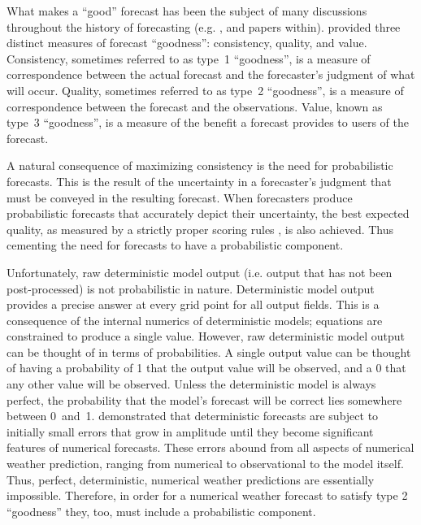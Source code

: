 What makes a ``good'' forecast has been the subject of many discussions throughout the history of forecasting (e.g. \citealp{Mascart1922, Winkler1968, Murphy1993}, \citealp{Murphy1996} and papers within).
\cite{Murphy1993} provided three distinct measures of forecast ``goodness'': consistency, quality, and value.
Consistency, sometimes referred to as \mbox{type 1} ``goodness'', is a measure of correspondence between the actual forecast and the forecaster's judgment of what will occur.
Quality, sometimes referred to as \mbox{type 2} ``goodness'', is a measure of correspondence between the forecast and the observations.
Value, known as \mbox{type 3} ``goodness'', is a measure of the benefit a forecast provides to users of the forecast.


A natural consequence of maximizing consistency is the need for probabilistic forecasts.
This is the result of the uncertainty in a forecaster's judgment that must be conveyed in the resulting forecast.
When forecasters produce probabilistic forecasts that accurately depict their uncertainty, the best expected quality, as measured by a strictly proper scoring rules \citep{Winkler1968}, is also achieved.
Thus cementing the need for forecasts to have a probabilistic component.


Unfortunately, raw deterministic model output (i.e. output that has not been post-processed) is not probabilistic in nature.
Deterministic model output provides a precise answer at every grid point for all output fields.
This is a consequence of the internal numerics of deterministic models; equations are constrained to produce a single value.
However, raw deterministic model output can be thought of in terms of probabilities.
A single output value can be thought of having a probability of 1 that the output value will be observed, and a 0 that any other value will be observed.
Unless the deterministic model is always perfect, the probability that the model's forecast will be correct lies somewhere between \mbox{0 and 1}.
\cite{Lorenz1963, Lorenz1965} demonstrated that deterministic forecasts are subject to initially small errors that grow in amplitude until they become significant features of numerical forecasts.
These errors abound from all aspects of numerical weather prediction, ranging from numerical to observational to the model itself.
Thus, perfect, deterministic, numerical weather predictions are essentially impossible.
Therefore, in order for a numerical weather forecast to satisfy type 2 ``goodness'' they, too, must include a probabilistic component.


